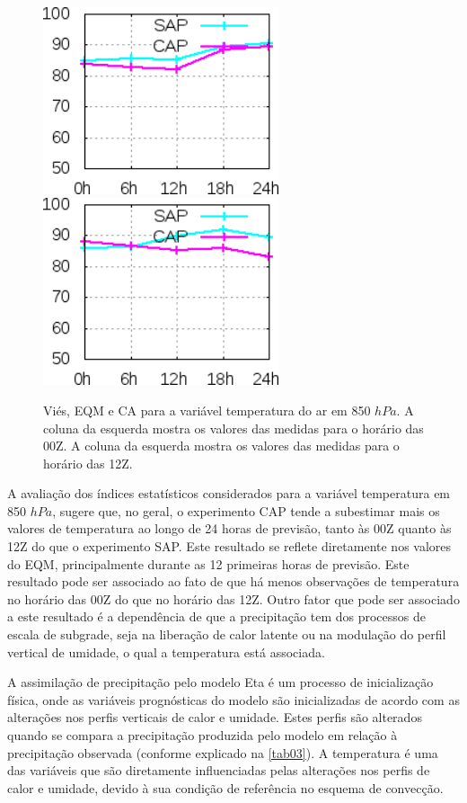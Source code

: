 \begin{figure}[!hbp]
\includegraphics[height=5.5cm]{./figs/CA850temp0Z.png}\includegraphics[height=5.5cm]{./figs/CA850temp12Z.png}
\caption{Viés, EQM e CA para a variável temperatura do ar em 850 $hPa$. A coluna da esquerda mostra os valores das medidas para o horário das 00Z. A coluna da esquerda mostra os valores das medidas para o horário das 12Z.}
\label{fig55}
\end{figure}

A avaliação dos índices estatísticos considerados para a variável temperatura em 850 $hPa$, sugere que, no geral, o experimento CAP tende a subestimar mais os valores de temperatura ao longo de 24 horas de previsão, tanto às 00Z quanto às 12Z do que o experimento SAP. Este resultado se reflete diretamente nos valores do EQM, principalmente durante as 12 primeiras horas de previsão. Este resultado pode ser associado ao fato de que há menos observações de temperatura no horário das 00Z do que no horário das 12Z. Outro fator que pode ser associado a este resultado é a dependência de que a precipitação tem dos processos de escala de subgrade, seja na liberação de calor latente ou na modulação do perfil vertical de umidade, o qual a temperatura está associada.

A assimilação de precipitação pelo modelo Eta é um processo de inicialização física, onde as variáveis prognósticas do modelo são inicializadas de acordo com as alterações nos perfis verticais de calor e umidade. Estes perfis são alterados quando se compara a precipitação produzida pelo modelo em relação à precipitação observada (conforme explicado na \autoref{tab03}). A temperatura é uma das variáveis que são diretamente influenciadas pelas alterações nos perfis de calor e umidade, devido à sua condição de referência no esquema de convecção. 

